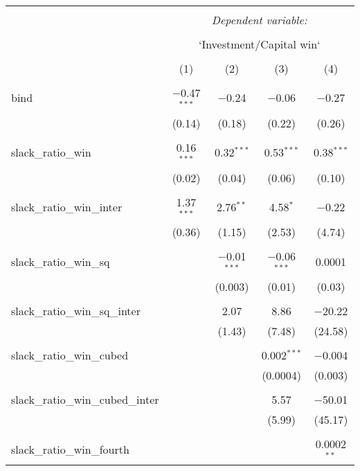 
\begin{table}[!htbp] \centering 
  \caption{} 
  \label{} 
\begin{tabular}{@{\extracolsep{5pt}}lcccc} 
\\[-1.8ex]\hline 
\hline \\[-1.8ex] 
 & \multicolumn{4}{c}{\textit{Dependent variable:}} \\ 
\cline{2-5} 
\\[-1.8ex] & \multicolumn{4}{c}{`Investment/Capital win`} \\ 
\\[-1.8ex] & (1) & (2) & (3) & (4)\\ 
\hline \\[-1.8ex] 
 bind & $-$0.47$^{***}$ & $-$0.24 & $-$0.06 & $-$0.27 \\ 
  & (0.14) & (0.18) & (0.22) & (0.26) \\ 
  & & & & \\ 
 slack\_ratio\_win & 0.16$^{***}$ & 0.32$^{***}$ & 0.53$^{***}$ & 0.38$^{***}$ \\ 
  & (0.02) & (0.04) & (0.06) & (0.10) \\ 
  & & & & \\ 
 slack\_ratio\_win\_inter & 1.37$^{***}$ & 2.76$^{**}$ & 4.58$^{*}$ & $-$0.22 \\ 
  & (0.36) & (1.15) & (2.53) & (4.74) \\ 
  & & & & \\ 
 slack\_ratio\_win\_sq &  & $-$0.01$^{***}$ & $-$0.06$^{***}$ & 0.0001 \\ 
  &  & (0.003) & (0.01) & (0.03) \\ 
  & & & & \\ 
 slack\_ratio\_win\_sq\_inter &  & 2.07 & 8.86 & $-$20.22 \\ 
  &  & (1.43) & (7.48) & (24.58) \\ 
  & & & & \\ 
 slack\_ratio\_win\_cubed &  &  & 0.002$^{***}$ & $-$0.004 \\ 
  &  &  & (0.0004) & (0.003) \\ 
  & & & & \\ 
 slack\_ratio\_win\_cubed\_inter &  &  & 5.57 & $-$50.01 \\ 
  &  &  & (5.99) & (45.17) \\ 
  & & & & \\ 
 slack\_ratio\_win\_fourth &  &  &  & 0.0002$^{**}$ \\ 

\end{tabular}
\end{table}
